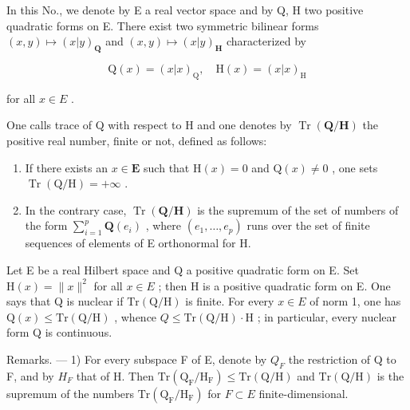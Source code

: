 
In this No., we denote by E a real vector space and by Q, H two positive quadratic forms on E. There exist two symmetric bilinear forms \((x,y)\mapsto(x|y)_{\mathbf{Q}}\) and \((x,y)\mapsto(x|y)_{\mathbf{H}}\) characterized by

\[
\mathrm{Q} (x) = (x | x) _ {\mathrm{Q}}, \quad \mathrm{H} (x) = (x | x) _ {\mathrm{H}}
\]

for all \(x \in E\) .

One calls trace of Q with respect to H and one denotes by \(\operatorname{Tr}\left(\mathbf{Q}/\mathbf{H}\right)\) the positive real number, finite or not, defined as follows:

\begin{enumerate}
\def\labelenumi{\alph{enumi})}
\item
  If there exists an \(x \in \mathbf{E}\) such that \(\mathrm{H}(x) = 0\) and \(\mathrm{Q}(x) \neq 0\) , one sets \(\operatorname{Tr}(\mathrm{Q} / \mathrm{H}) = +\infty\) .
\item
  In the contrary case, \(\operatorname{Tr}(\mathbf{Q}/\mathbf{H})\) is the supremum of the set of numbers of the form \(\sum_{i=1}^{p} \mathbf{Q}(e_i)\) , where \((e_1, \ldots, e_p)\) runs over the set of finite sequences of elements of E orthonormal for H.
\end{enumerate}

Let E be a real Hilbert space and Q a positive quadratic form on E. Set \(\mathrm{H}(x)=\|x\|^{2}\) for all \(x\in E\) ; then H is a positive quadratic form on E. One says that Q is nuclear if \(\mathrm{Tr}\left(\mathrm{Q}/\mathrm{H}\right)\) is finite. For every \(x\in E\) of norm 1, one has \(\mathrm{Q}(x)\leqslant\mathrm{Tr}\left(\mathrm{Q}/\mathrm{H}\right)\) , whence \(Q\leqslant\mathrm{Tr}\left(\mathrm{Q}/\mathrm{H}\right)\cdot\mathrm{H}\) ; in particular, every nuclear form Q is continuous.

Remarks. --- 1) For every subspace F of E, denote by \(Q_{F}\) the restriction of Q to F, and by \(H_{F}\) that of H. Then \(\mathrm{Tr}\left(\mathrm{Q}_{\mathrm{F}}/\mathrm{H}_{\mathrm{F}}\right) \leqslant \mathrm{Tr}\left(\mathrm{Q}/\mathrm{H}\right)\) and \(\mathrm{Tr}\left(\mathrm{Q}/\mathrm{H}\right)\) is the supremum of the numbers \(\mathrm{Tr}\left(\mathrm{Q}_{\mathrm{F}}/\mathrm{H}_{\mathrm{F}}\right)\) for \(F \subset E\) finite-dimensional.

